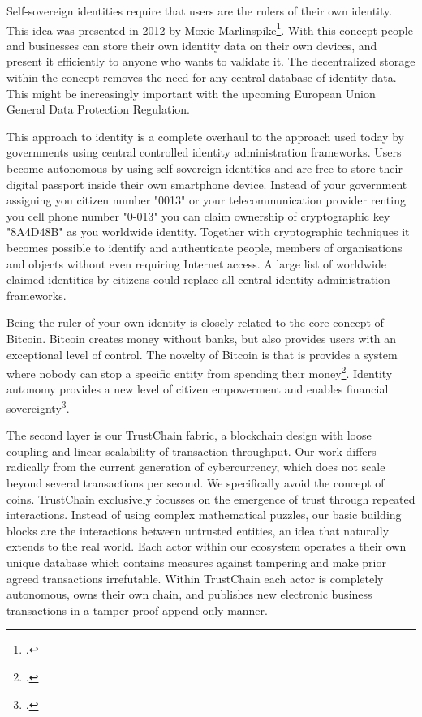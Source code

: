 \documentclass[USenglish]{article}
\begin{document}
Self-sovereign identities require that users are the rulers of their own identity.
This idea was presented in 2012 by Moxie Marlinspike\footcite{sovereignsource}.
With this concept people and businesses can store their own identity data on their own devices, and present it efficiently to anyone who wants to validate it.
The decentralized storage within the concept removes the need for any central database of identity data.
This might be increasingly important with the upcoming European Union General Data Protection Regulation.

This approach to identity is a complete overhaul to the approach used today by governments using central controlled identity administration frameworks.
Users become autonomous by using self-sovereign identities and are free to store their digital passport inside their own smartphone device.
Instead of your government assigning you citizen number "0013" or your telecommunication provider renting you cell phone number "0-013" you can claim ownership of cryptographic key "8A4D48B" as you worldwide identity.
Together with cryptographic techniques it becomes possible to identify and authenticate people, members of organisations and objects without even requiring Internet access.
A large list of worldwide claimed identities by citizens could replace all central identity administration frameworks.

Being the ruler of your own identity is closely related to the core concept of Bitcoin.
Bitcoin creates money without banks, but also provides users with an exceptional level of control.
The novelty of Bitcoin is that is provides a system where nobody can stop a specific entity from spending their money\footcite{r3corda}.
Identity autonomy provides a new level of citizen empowerment and enables financial sovereignty\footcite{matouk2009financial}.

The second layer is our TrustChain fabric, a blockchain design with loose coupling and linear scalability of transaction throughput. 
Our work differs radically from the current generation of cybercurrency, which does not scale beyond several transactions per second. 
We specifically avoid the concept of coins.
TrustChain exclusively focusses on the emergence of trust through repeated interactions.
Instead of using complex mathematical puzzles, our basic building blocks are the interactions between untrusted entities, an idea that naturally extends to the real world.
Each actor within our ecosystem operates a their own unique database which contains measures against tampering and make prior agreed transactions irrefutable.
Within TrustChain each actor is completely autonomous, owns their own chain, and publishes new electronic business transactions in a tamper-proof append-only manner.
\end{document}
